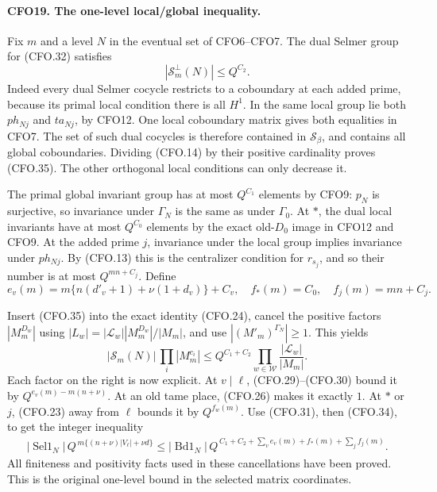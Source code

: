 \paragraph{CFO19. The one-level local/global inequality.}
\label{claim:CFO19}
Fix $m$ and a level $N$ in the eventual set of CFO6--CFO7.
The dual Selmer group for (CFO.32) satisfies
\[
                         |\mathscr S_m^\perp(N)|\le Q^{C_2}.
                                                                    \tag{CFO.35}
\]
Indeed every dual Selmer cocycle restricts to a
coboundary at each added prime, because its primal
local condition there is all $H^1$.  In the same local
group lie both $ph_{Nj}$ and $ta_{Nj}$, by CFO12.
One local coboundary matrix gives both equalities in
CFO7.  The set of such dual cocycles is therefore
contained in $\mathcal S_\beta$, and contains all
global coboundaries.  Dividing (CFO.14) by their
positive cardinality proves (CFO.35).  The other
orthogonal local conditions can only decrease it.

The primal global invariant group has at most $Q^{C_1}$
elements by CFO9: $p_N$ is surjective, so invariance
under $\Gamma_N$ is the same as under $\Gamma_0$.
At $\ast$, the dual local invariants have at most
$Q^{C_0}$ elements by the exact old-$D_0$ image in
CFO12 and CFO9.  At the added prime $j$, invariance
under the local group implies invariance under
$ph_{Nj}$.  By (CFO.13) this is the centralizer
condition for $r_{s_j}$, and so their number is at
most $Q^{mn+C_j}$.  Define
\[
 e_v(m)=m\{n(d'_v+1)+\nu(1+d_v)\}+C_v,\quad
 f_\ast(m)=C_0,\quad f_j(m)=mn+C_j.                             \tag{CFO.36}
\]

Insert (CFO.35) into the exact identity (CFO.24),
cancel the positive factors $|M_m^{D_w}|$ using
$|L_w|=|\mathcal L_w||M_m^{D_w}|/|M_m|$, and use
$|(M'_m)^{\Gamma_N}|\ge1$.  This yields
\[
 |\mathscr S_m(N)|\,\prod_i|M_m^{c_i}|
 \le Q^{C_1+C_2}
       \prod_{w\in\mathcal W}\frac{|\mathcal L_w|}{|M_m|}.
                                                                    \tag{CFO.37}
\]
Each factor on the right is now explicit.
At $v\mid\ell$, (CFO.29)--(CFO.30) bound it by
$Q^{e_v(m)-m(n+\nu)}$.
At an old tame place, (CFO.26) makes it exactly $1$.
At $\ast$ or $j$, (CFO.23) away from $\ell$ bounds it
by $Q^{f_w(m)}$.  Use (CFO.31), then (CFO.34), to get
the integer inequality
\[
 \begin{split}
 |\operatorname{Sel1}_N|\,
 Q^{\,m\{(n+\nu)|V_\ell|+\nu d\}}
 \le |\operatorname{Bd1}_N|\,
 Q^{\,C_1+C_2+\sum_v e_v(m)+f_\ast(m)+\sum_j f_j(m)} .
 \end{split}                                                     \tag{CFO.38}
\]
All finiteness and positivity facts used in these
cancellations have been proved.  This is the original
one-level bound in the selected matrix coordinates.

